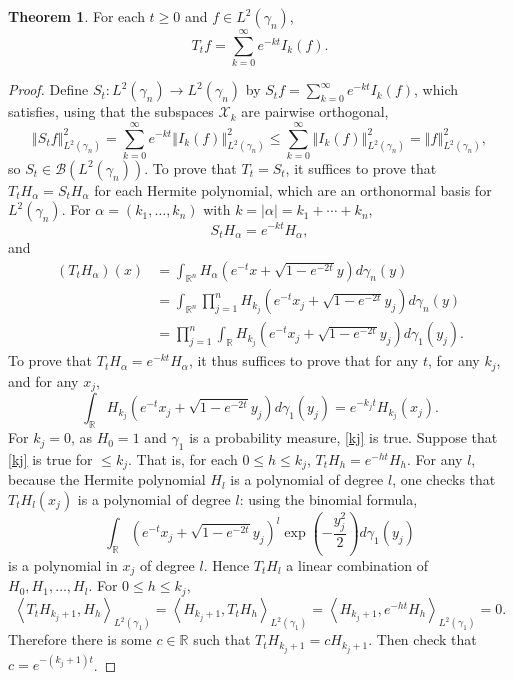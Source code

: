 \documentclass{article}
\newcommand{\inner}[2]{\left\langle #1, #2 \right\rangle}
\newcommand{\norm}[1]{\left\Vert #1 \right\Vert}
\theoremstyle{definition}
\newtheorem{theorem}{Theorem}
\theoremstyle{definition}
\begin{document}
\begin{theorem}
For each $t \geq 0$ and $f \in L^2(\gamma_n)$,
\[
T_t f = \sum_{k=0}^\infty e^{-kt} I_k(f).
\]
\label{projections}
\end{theorem}
\begin{proof}
Define $S_t:L^2(\gamma_n) \to L^2(\gamma_n)$ by $S_t f = \sum_{k=0}^\infty e^{-kt} I_k(f)$, which satisfies, using that
the subspaces $\mathcal{X}_k$ are pairwise orthogonal,
\[
\norm{S_t f}_{L^2(\gamma_n)}^2 = \sum_{k=0}^\infty e^{-kt} \norm{I_k(f)}_{L^2(\gamma_n)}^2
\leq  \sum_{k=0}^\infty \norm{I_k(f)}_{L^2(\gamma_n)}^2
=\norm{f}_{L^2(\gamma_n)}^2,
\]
so $S_t \in \mathscr{B}(L^2(\gamma_n))$. 
To prove that $T_t = S_t$, it suffices to prove that $T_t H_\alpha= S_t H_\alpha$ for each Hermite polynomial, which are
an orthonormal basis for $L^2(\gamma_n)$. 
For $\alpha=(k_1,\ldots,k_n)$ with $k=|\alpha|=k_1+\cdots+k_n$,
\[
S_t H_\alpha = e^{-kt} H_\alpha,
\]
and
\begin{align*}
(T_t H_\alpha)(x)&=\int_{\mathbb{R}^n} H_\alpha\left(e^{-t}x+\sqrt{1-e^{-2t}}y\right)d\gamma_n(y)\\
&=\int_{\mathbb{R}^n} \prod_{j=1}^n H_{k_j}\left(e^{-t}x_j+\sqrt{1-e^{-2t}}y_j\right) d\gamma_n(y)\\
&=\prod_{j=1}^n \int_{\mathbb{R}} H_{k_j}\left(e^{-t}x_j+\sqrt{1-e^{-2t}}y_j\right) d\gamma_1(y_j).
\end{align*}
To prove that $T_t H_\alpha = e^{-kt} H_\alpha$, it thus suffices to prove that for any 
$t$, for any $k_j$, and for any $x_j$,
\begin{equation}
\int_{\mathbb{R}} H_{k_j}\left(e^{-t}x_j+\sqrt{1-e^{-2t}}y_j\right) d\gamma_1(y_j) = e^{-k_j t} H_{k_j}(x_j).
\label{kj}
\end{equation}
For $k_j=0$, as $H_0=1$ and $\gamma_1$ is a probability measure, \eqref{kj} is true. 
Suppose that \eqref{kj} is true for  $\leq k_j$. That is, for each $0 \leq h \leq k_j$,
$T_t H_{h} = e^{-h t} H_{h}$. For any $l$, because the Hermite polynomial $H_l$ is a polynomial of degree
$l$, one checks that $T_t H_l(x_j)$ is a polynomial of degree $l$: using the binomial formula,
\[
\int_{\mathbb{R}} (e^{-t}x_j+\sqrt{1-e^{-2t}}y_j)^l \exp\left(-\frac{y_j^2}{2}\right) d\gamma_1(y_j)
\]
is a polynomial in $x_j$ of degree $l$. 
Hence $T_t H_l$ a linear combination of $H_0,H_1,\ldots,H_l$.  
For $0 \leq h \leq k_j$,
\[
\inner{T_t H_{k_j+1}}{H_h}_{L^2(\gamma_1)}=
\inner{H_{k_j+1}}{T_t H_h}_{L^2(\gamma_1)}
=\inner{H_{k_j+1}}{e^{-ht}H_h}_{L^2(\gamma_1)}
=0.
\]
Therefore there is some $c \in \mathbb{R}$ such that
$T_t H_{k_j+1} = c H_{k_j+1}$. Then check that
$c=e^{-(k_j+1)t}$. 
\end{proof}
\end{document}
